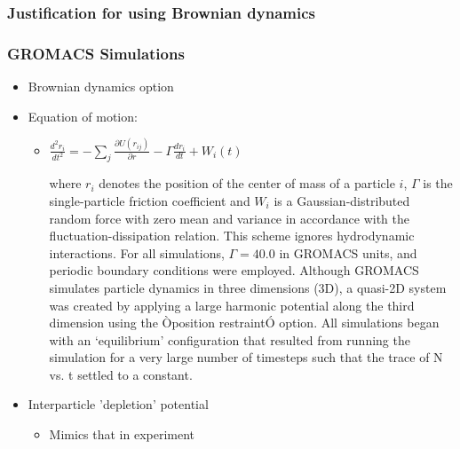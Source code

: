 \documentclass[11pt]{article}
\begin{document}
\subsubsection{Justification for using Brownian dynamics}
\label{sec-2.3.2}

\subsubsection{GROMACS Simulations}
\label{sec-2.3.3}

\begin{itemize}

\item Brownian dynamics option\\
\label{sec-2.3.3.1}


\item Equation of motion:\\
\label{sec-2.3.3.2}

\begin{itemize}

\item $\frac{d^2 r_i}{dt^2}  = - \sum_j \frac{\partial{U(r_{ij})}}{{\partial r}}  - \Gamma  \frac{d r_i}{dt} + W_i (t)$\\
\label{sec-2.3.3.2.1}

where $r_i$ denotes the position of the center of mass of a particle $i$, $\Gamma$ is the single-particle friction coefficient and $W_i$ is a Gaussian-distributed random force with zero mean and variance in accordance with the fluctuation-dissipation relation.  This scheme ignores hydrodynamic interactions. For all simulations, $\Gamma=40.0$ in GROMACS units, and periodic boundary conditions were employed. Although GROMACS simulates particle dynamics in three dimensions (3D), a quasi-2D system was created by applying a large harmonic potential along the third dimension using the Òposition restraintÓ option. All simulations began with an `equilibrium' configuration that resulted from running the simulation for a very large number of timesteps such that the trace of N vs. t settled to a constant.
\end{itemize} %

\item Interparticle 'depletion' potential\\
\label{sec-2.3.3.3}

\begin{itemize}

\item Mimics that in experiment\\
\label{sec-2.3.3.3.1}



\end{itemize}
\end{itemize}
\end{document}
